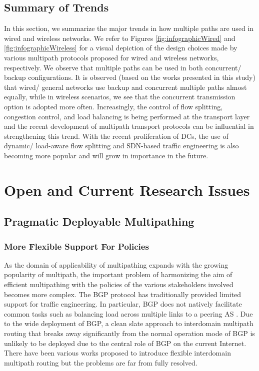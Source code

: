 \documentclass[10pt]{IEEEtran}
\begin{document}
\subsection{Summary of Trends}
\label{subsec:design_guidelines}

In this section, we summarize the major trends in how multiple paths are used in wired and wireless networks. We refer to Figures \ref{fig:infographicWired}
and \ref{fig:infographicWireless} for a visual depiction of the design choices made by various multipath protocols proposed for wired and wireless networks, respectively. We observe that multiple paths can be used in both concurrent/ backup configurations. It is observed (based on the works presented in this study) that wired/ general networks use backup and concurrent multiple paths almost equally, while in wireless scenarios, we see that the concurrent transmission option is adopted more often. Increasingly, the control of flow splitting, congestion control, and load balancing is being performed at the transport layer and the recent development of multipath transport protocols can be influential in strengthening this trend. With the recent proliferation of DCs, the use of dynamic/ load-aware flow splitting and SDN-based traffic engineering is also becoming more popular and will grow in importance in the future. 









\section{Open and Current Research Issues}
\label{sec:future_wrk}



\subsection{Pragmatic Deployable Multipathing}

\vspace{2mm}
\subsubsection{More Flexible Support For Policies}



As the domain of applicability of multipathing expands with the growing popularity of multipath, the important problem of harmonizing the aim of efficient multipathing with the policies of the various stakeholders involved becomes more complex. The BGP protocol has traditionally provided limited support for traffic engineering. In particular, BGP does not natively facilitate common tasks such as balancing load across multiple links to a peering AS \cite{feamster2003guidelines}. Due to the wide deployment of BGP, a clean slate approach to interdomain multipath routing that breaks away significantly from the normal operation mode of BGP is unlikely to be deployed due to the central role of BGP on the current Internet. There have been various works proposed to introduce flexible interdomain multipath routing but the problems are far from fully resolved.
\end{document}

